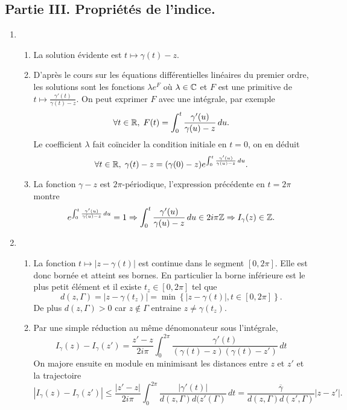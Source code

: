 \subsection*{Partie III. Propriétés de l'indice.}
\begin{enumerate}
 \item 
\begin{enumerate}
 \item La solution évidente est $t\mapsto \gamma(t) - z$.
 \item D'après le cours sur les équations différentielles linéaires du premier ordre, les solutions sont les fonctions $\lambda e^{F}$ où $\lambda \in \mathbb{C}$ et $F$ est une primitive de $t \mapsto \frac{\gamma'(t)}{\gamma(t) - z}$. On peut exprimer $F$ avec une intégrale, par exemple 
\[
 \forall t \in  \mathbb{R}, \; F(t) = \int_0^t \frac{\gamma'(u)}{\gamma(u) - z}\, du.
\]
Le coefficient $\lambda$ fait coïncider la condition initiale en $t=0$, on en déduit
\[
 \forall t \in \mathbb{R}, \;
 \gamma(t) - z = (\gamma(0) - z)e^{\int_0^t \frac{\gamma'(u)}{\gamma(u) - z}\, du} .
\]

 \item La fonction $\gamma -z$ est $2\pi$-périodique, l'expression précédente en $t = 2\pi$ montre 
\[
e^{\int_0^t \frac{\gamma'(u)}{\gamma(u) - z}\, du} = 1
\Rightarrow \int_0^t \frac{\gamma'(u)}{\gamma(u) - z}\, du \in 2i\pi \mathbb{Z} \Rightarrow I_\gamma(z) \in \mathbb{Z}.
\]

\end{enumerate}
 
 \item
\begin{enumerate}
 \item La fonction $t\mapsto \left| z - \gamma(t)\right|$ est continue dans le segment $[0, 2 \pi]$. Elle est donc bornée et atteint ses bornes. En particulier la borne inférieure est le plus petit élément et il existe $t_z \in [ 0, 2\pi ]$ tel que
\[
 d(z,\Gamma) = \left| z - \gamma(t_z)\right| = \min \left\lbrace \left| z - \gamma(t) \right|, t\in [0, 2\pi ] \right\rbrace .
\]
De plus $d(z,\Gamma) > 0$ car $z\notin \Gamma$ entraine $z \neq \gamma(t_z)$.

 \item Par une simple réduction au même dénomonateur sous l'intégrale,
\[
 I_\gamma(z) - I_\gamma(z')
 = \frac{z' - z}{2i\pi}\int_0^{2\pi}\frac{\gamma'(t)}{(\gamma(t)-z)(\gamma(t)-z')}\,dt
\]
On majore ensuite en module en minimisant les distances entre $z$ et $z'$ et la trajectoire 
\[
 \left| I_\gamma(z) - I_\gamma(z') \right|
 \leq \frac{|z' - z|}{2i\pi}\int_0^{2\pi}\frac{|\gamma'(t)|}{d(z,\Gamma)d(z'(\Gamma)}\,dt 
 = \frac{\overline{\gamma}}{d(z,\Gamma)d(z',\Gamma)} |z - z'|.
\]


\end{enumerate}
\end{enumerate}
